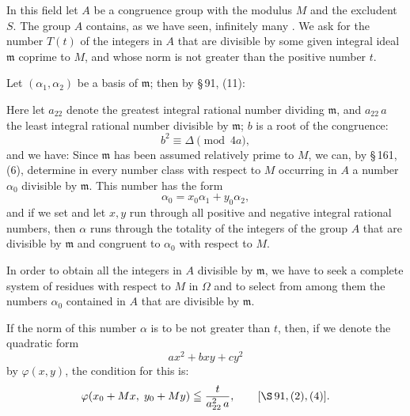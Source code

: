 In this field let $A$ be a congruence group with the modulus
$M$ and the excludent $S$. The group $A$ contains, as we have
 seen, infinitely many . We ask for the number
$T(t)$ of the integers in $A$ that are divisible by some
given integral ideal $\mathfrak{m}$ coprime to $M$, and whose
norm is not greater than the positive number $t$.

Let $(\alpha_1, \alpha_2)$ be a basis of $\mathfrak{m}$; then by \S\,91, (11):

Here let $a_{22}$ denote the greatest integral rational
number dividing $\mathfrak{m}$, and $a_{22}\,a$ the least integral rational number
divisible by $\mathfrak{m}$; $b$ is a root of the congruence:
\[
b^2 \equiv \Delta \pmod{4a},
\]
and we have:
Since $\mathfrak{m}$ has been assumed relatively prime to $M$, we can, by
\S\,161, (6), determine in every number class with respect to $M$
occurring in $A$ a number $\alpha_0$ divisible by $\mathfrak{m}$. This number has the form
\[
\alpha_0 = x_0\alpha_1 + y_0\alpha_2,
\]
and if we set
and let $x, y$ run through all positive and negative integral
rational numbers, then $\alpha$ runs through the totality of the
integers of the group $A$ that are divisible by $\mathfrak{m}$ and congruent
to $\alpha_0$ with respect to $M$.

In order to obtain all the integers in $A$ divisible by $\mathfrak{m}$,
we have to seek a complete system of residues with respect to $M$ in $\Omega$
and to select from among them the numbers $\alpha_0$ contained in $A$
that are divisible by $\mathfrak{m}$.

If the norm of this number $\alpha$ is to be not greater than $t$, then,
 if we denote the quadratic form
\[
a x^2 + b x y + c y^2
\]
by $\varphi(x, y)$, the condition for this is:
\[
\varphi(x_0 + Mx, \; y_0 + My) \leqq \dfrac{t}{a_{22}^2\,a}, \qquad [\S\,91, (2), (4)].
\]
